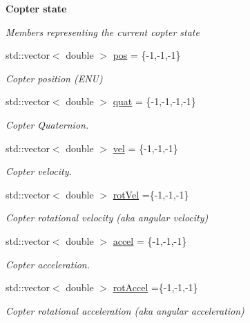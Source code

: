 \begin{Indent}{\bf Copter state}\par
{\em \label{classFinken_copterstate}%
\hypertarget{classFinken_copterstate}{}%
 Members representing the current copter state }\begin{DoxyCompactItemize}
\item 
std\+::vector$<$ double $>$ \hyperlink{classFinken_a726c0ea1d756fe0837a3f042665d8d4a}{pos} = \{-\/1,-\/1,-\/1\}
\begin{DoxyCompactList}\small\item\em Copter position (E\+NU) \end{DoxyCompactList}\item 
std\+::vector$<$ double $>$ \hyperlink{classFinken_a3968cbe3b6f76678367ecb61f044a221}{quat} = \{-\/1,-\/1,-\/1,-\/1\}
\begin{DoxyCompactList}\small\item\em Copter Quaternion. \end{DoxyCompactList}\item 
std\+::vector$<$ double $>$ \hyperlink{classFinken_a4dd260e6384e7cfb8040bd53fe1c2d62}{vel} = \{-\/1,-\/1,-\/1\}
\begin{DoxyCompactList}\small\item\em Copter velocity. \end{DoxyCompactList}\item 
std\+::vector$<$ double $>$ \hyperlink{classFinken_a518ab8ab8ac8cf54c0b79cbc1ec2075f}{rot\+Vel} =\{-\/1,-\/1,-\/1\}
\begin{DoxyCompactList}\small\item\em Copter rotational velocity (aka angular velocity) \end{DoxyCompactList}\item 
std\+::vector$<$ double $>$ \hyperlink{classFinken_a6f9723479baee5573447036270a2a722}{accel} = \{-\/1,-\/1,-\/1\}
\begin{DoxyCompactList}\small\item\em Copter acceleration. \end{DoxyCompactList}\item 
std\+::vector$<$ double $>$ \hyperlink{classFinken_ab1b738a1b691879be240b1b9488f7009}{rot\+Accel} =\{-\/1,-\/1,-\/1\}
\begin{DoxyCompactList}\small\item\em Copter rotational acceleration (aka angular acceleration) \end{DoxyCompactList}\end{DoxyCompactItemize}
\end{Indent}
